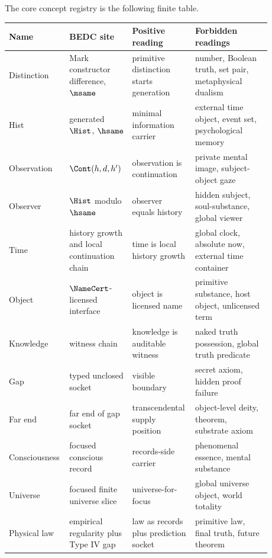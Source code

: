 \begin{definition}
\label{def:philosophy-core-concept-registry-table}
The core concept registry is the following finite table.

\begin{center}
\begin{tabular}{p{0.16\linewidth}p{0.22\linewidth}p{0.22\linewidth}p{0.28\linewidth}}
\textbf{Name} & \textbf{BEDC site} & \textbf{Positive reading} & \textbf{Forbidden readings} \\
\hline
Distinction & Mark constructor difference, \(\msame\) & primitive distinction starts generation & number, Boolean truth, set pair, metaphysical dualism \\
Hist & generated \(\Hist\), \(\hsame\) & minimal information carrier & external time object, event set, psychological memory \\
Observation & \(\Cont(h,d,h')\) & observation is continuation & private mental image, subject-object gaze \\
Observer & \(\Hist\) modulo \(\hsame\) & observer equals history & hidden subject, soul-substance, global viewer \\
Time & history growth and local continuation chain & time is local history growth & global clock, absolute now, external time container \\
Object & \(\NameCert\)-licensed interface & object is licensed name & primitive substance, host object, unlicensed term \\
Knowledge & witness chain & knowledge is auditable witness & naked truth possession, global truth predicate \\
Gap & typed unclosed socket & visible boundary & secret axiom, hidden proof failure \\
Far end & far end of gap socket & transcendental supply position & object-level deity, theorem, substrate axiom \\
Consciousness & focused conscious record & records-side carrier & phenomenal essence, mental substance \\
Universe & focused finite universe slice & universe-for-focus & global universe object, world totality \\
Physical law & empirical regularity plus Type IV gap & law as records plus prediction socket & primitive law, final truth, future theorem \\
\end{tabular}
\end{center}
\end{definition}

